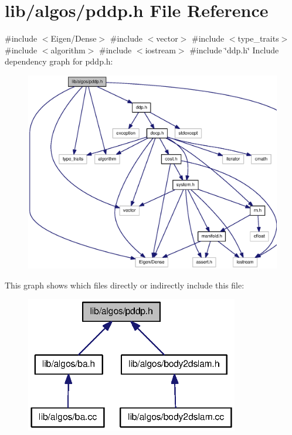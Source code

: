 \section{lib/algos/pddp.h \-File \-Reference}
\label{pddp_8h}
{\ttfamily \#include $<$\-Eigen/\-Dense$>$}\*
{\ttfamily \#include $<$vector$>$}\*
{\ttfamily \#include $<$type\-\_\-traits$>$}\*
{\ttfamily \#include $<$algorithm$>$}\*
{\ttfamily \#include $<$iostream$>$}\*
{\ttfamily \#include \char`\"{}ddp.\-h\char`\"{}}\*
\-Include dependency graph for pddp.\-h\-:
\nopagebreak
\begin{figure}[H]
\begin{center}
\leavevmode
\includegraphics[width=350pt]{pddp_8h__incl}
\end{center}
\end{figure}
\-This graph shows which files directly or indirectly include this file\-:
\nopagebreak
\begin{figure}[H]
\begin{center}
\leavevmode
\includegraphics[width=264pt]{pddp_8h__dep__incl}
\end{center}
\end{figure}
